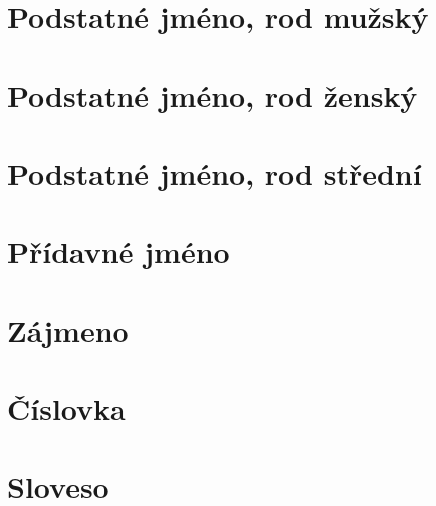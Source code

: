 \section{Podstatné jméno, rod mužský}            \label{sec:morpho_m}
{\small{}}


\section{Podstatné jméno, rod ženský}            \label{sec:morpho_f}
{\small{}}


\section{Podstatné jméno, rod střední}           \label{sec:morpho_n}
{\small{}}


\section{Přídavné jméno}                         \label{sec:morpho_adj}
{\small{}}


\section{Zájmeno}                                \label{sec:morpho_pron}


\section{Číslovka}                               \label{sec:morpho_num}
{\small{}}

\section{Sloveso}                                \label{sec:morpho_v}



\fi


\cleardoublepage
\printindex[figures]

